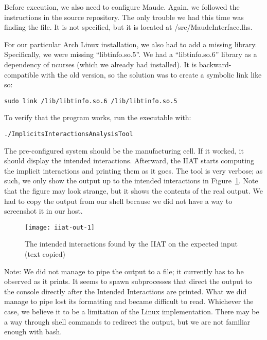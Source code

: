 Before execution, we also need to configure Maude.
Again, we followed the instructions in the source repository.
The only trouble we had this time was finding the file.
It is not specified, but it is located at /src/MaudeInterface.lhs.

For our particular Arch Linux installation, we also had to add a missing library.
Specifically, we were missing ``libtinfo.so.5''.
We had a ``libtinfo.so.6'' library as a dependency of ncurses (which we already had installed).
It is backward-compatible with the old version, so the solution was to create a symbolic link like so:
\begin{verbatim}sudo link /lib/libtinfo.so.6 /lib/libtinfo.so.5\end{verbatim}

To verify that the program works, run the executable with:
\begin{verbatim}./ImplicitsInteractionsAnalysisTool\end{verbatim}
The pre-configured system should be the manufacturing cell.
If it worked, it should display the intended interactions.
Afterward, the IIAT starts computing the implicit interactions and printing them as it goes.
The tool is very verbose; as such, we only show the output up to the intended interactions in Figure~\ref{fig:iiat-out}.
Note that the figure may look strange, but it shows the contents of the real output.
We had to copy the output from our shell because we did not have a way to screenshot it in our host.
\begin{figure}[ht]
    \centering
    \texttt{[image: iiat-out-1]}
    \caption{The intended interactions found by the IIAT on the expected input (text copied)}
    \label{fig:iiat-out}
\end{figure}

Note: We did not manage to pipe the output to a file; it currently has to be observed as it prints.
It seems to spawn subprocesses that direct the output to the console directly after the Intended Interactions are printed.
What we did manage to pipe lost its formatting and became difficult to read.
Whichever the case, we believe it to be a limitation of the Linux implementation.
There may be a way through shell commands to redirect the output, but we are not familiar enough with bash.

